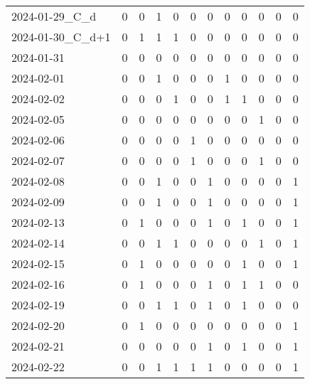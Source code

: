 \documentclass[dvipdfmx,oneside]{article}
\begin{document}
\begin{tabular}{lccccccccccc}
  2024-01-29\_C\_d &     0 &     0 &     1 &     0 &     0 &     0 &     0 &     0 &     0 &     0 &     0 \\
2024-01-30\_C\_d+1 &     0 &     1 &     1 &     1 &     0 &     0 &     0 &     0 &     0 &     0 &     0 \\
        2024-01-31 &     0 &     0 &     0 &     0 &     0 &     0 &     0 &     0 &     0 &     0 &     0 \\
        2024-02-01 &     0 &     0 &     1 &     0 &     0 &     0 &     1 &     0 &     0 &     0 &     0 \\
        2024-02-02 &     0 &     0 &     0 &     1 &     0 &     0 &     1 &     1 &     0 &     0 &     0 \\
        2024-02-05 &     0 &     0 &     0 &     0 &     0 &     0 &     0 &     0 &     1 &     0 &     0 \\
        2024-02-06 &     0 &     0 &     0 &     0 &     1 &     0 &     0 &     0 &     0 &     0 &     0 \\
        2024-02-07 &     0 &     0 &     0 &     0 &     1 &     0 &     0 &     0 &     1 &     0 &     0 \\
        2024-02-08 &     0 &     0 &     1 &     0 &     0 &     1 &     0 &     0 &     0 &     0 &     1 \\
        2024-02-09 &     0 &     0 &     1 &     0 &     0 &     1 &     0 &     0 &     0 &     0 &     1 \\
        2024-02-13 &     0 &     1 &     0 &     0 &     0 &     1 &     0 &     1 &     0 &     0 &     1 \\
        2024-02-14 &     0 &     0 &     1 &     1 &     0 &     0 &     0 &     0 &     1 &     0 &     1 \\
        2024-02-15 &     0 &     1 &     0 &     0 &     0 &     0 &     0 &     1 &     0 &     0 &     1 \\
        2024-02-16 &     0 &     1 &     0 &     0 &     0 &     1 &     0 &     1 &     1 &     0 &     0 \\
        2024-02-19 &     0 &     0 &     1 &     1 &     0 &     1 &     0 &     1 &     0 &     0 &     0 \\
        2024-02-20 &     0 &     1 &     0 &     0 &     0 &     0 &     0 &     0 &     0 &     0 &     1 \\
        2024-02-21 &     0 &     0 &     0 &     0 &     0 &     1 &     0 &     1 &     0 &     0 &     1 \\
        2024-02-22 &     0 &     0 &     1 &     1 &     1 &     1 &     0 &     0 &     0 &     0 &     1 \\

\end{tabular}
\end{document}

